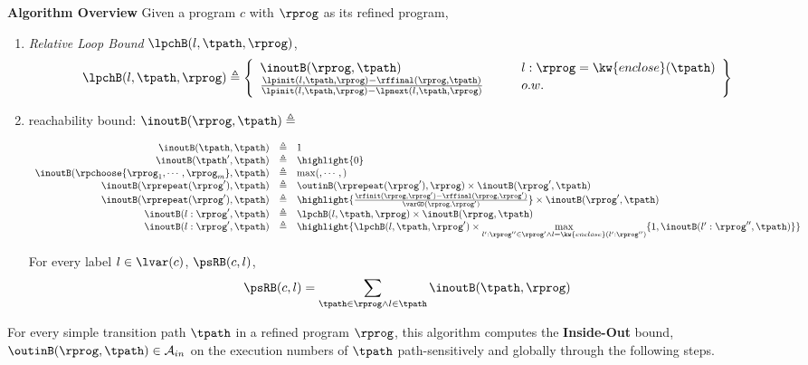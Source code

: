 \textbf{Algorithm Overview} 
Given a program $c$ with $\rprog$ as its refined program,
\begin{enumerate}
  \item 
  \emph{Relative Loop Bound} $\lpchB(l, \tpath, \rprog)$,
  \[
    \lpchB(l, \tpath, \rprog) \triangleq
    \left\{
    \begin{array}{ll}
      \inoutB(\rprog, \tpath)
      & \qquad{ l:\rprog = \kw{enclose}(\tpath)}
      \\
      \frac{\lpinit(l, \tpath, \rprog) - \rffinal(\rprog, \tpath)}{\lpinit(l, \tpath, \rprog) - \lpnext(l, \tpath, \rprog)}
      & \qquad o.w.
    \end{array}
    \right\}
    \]
    \item  reachability bound:
    $\inoutB(\rprog, \tpath) \triangleq $

    \[
      \begin{array}{rcl}
        \inoutB(\tpath, \tpath) & \triangleq & 1 \\
        \inoutB(\tpath', \tpath) & \triangleq & \highlight{0} \\
        \inoutB(\rpchoose{\rprog_1, \cdots, \rprog_m }, \tpath) & \triangleq & \max(, \cdots, ) \\
        \inoutB(\rprepeat(\rprog'), \tpath) & \triangleq & \outinB(\rprepeat(\rprog'), \rprog) \times \inoutB(\rprog', \tpath)\\
        \inoutB(\rprepeat(\rprog'), \tpath) & \triangleq 
        & \highlight{\frac{\rfinit(\rprog, \rprog') - \rffinal(\rprog, \rprog')}{\varGD(\rprog, \rprog')}}
         \times \inoutB(\rprog', \tpath)
         \\
        \inoutB(l: \rprog', \tpath) & \triangleq & \lpchB(l, \tpath, \rprog) \times \inoutB(\rprog, \tpath) \\
        \inoutB(l: \rprog', \tpath) & \triangleq & 
        \highlight{
          \lpchB(l, \tpath, \rprog') \times 
        \max\limits_{l':\rprog'' \in \rprog' \land l = \kw{enclose}(l':\rprog'')}
       \{1, \inoutB(l':\rprog'', \tpath)\} }
        \\
        \end{array}
      \]
    
     For every label $l \in \lvar(c)$, $\psRB(c, l)$,
    \[ 
      \psRB(c, l) = \sum\limits_{\tpath \in \rprog \land 
    l \in \tpath} \inoutB(\tpath, \rprog)
    \]

\end{enumerate}


For every simple transition path $\tpath$ in a refined program $\rprog$, 
this algorithm
computes the \textbf{Inside-Out} bound, $\outinB(\rprog, \tpath) \in \mathcal{A}_{in}$
on the execution numbers of $\tpath$ path-sensitively and globally
through the following steps.

